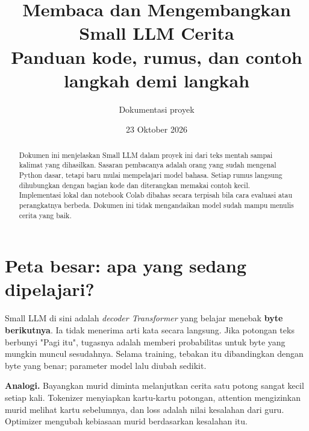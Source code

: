 \documentclass[11pt,a4paper]{article}
\title{Membaca dan Mengembangkan Small LLM Cerita\\
\large Panduan kode, rumus, dan contoh langkah demi langkah}
\author{Dokumentasi proyek \code{train-llm-from-scratch}}
\date{23 Oktober 2026}
\newcommand{\analogi}[1]{\par\smallskip\noindent\textbf{Analogi.} #1\par\smallskip}
\begin{document}
\maketitle
\begin{abstract}
Dokumen ini menjelaskan Small LLM dalam proyek ini dari teks mentah sampai
kalimat yang dihasilkan. Sasaran pembacanya adalah orang yang sudah mengenal
Python dasar, tetapi baru mulai mempelajari model bahasa. Setiap rumus
langsung dihubungkan dengan bagian kode dan diterangkan memakai contoh kecil.
Implementasi lokal dan notebook Colab dibahas secara terpisah bila cara
evaluasi atau perangkatnya berbeda. Dokumen ini tidak mengandaikan model sudah
mampu menulis cerita yang baik.
\end{abstract}
\tableofcontents
\newpage

\section{Peta besar: apa yang sedang dipelajari?}
\label{sec:peta}

Small LLM di sini adalah \emph{decoder Transformer} yang belajar menebak
\textbf{byte berikutnya}. Ia tidak menerima arti kata secara langsung. Jika
potongan teks berbunyi "Pagi itu", tugasnya adalah memberi probabilitas
untuk byte yang mungkin muncul sesudahnya. Selama training, tebakan itu
dibandingkan dengan byte yang benar; parameter model lalu diubah sedikit.

\begin{center}
\end{center}

\analogi{Bayangkan murid diminta melanjutkan cerita satu potong sangat kecil
setiap kali. Tokenizer menyiapkan kartu-kartu potongan, attention mengizinkan
murid melihat kartu sebelumnya, dan loss adalah nilai kesalahan dari guru.
Optimizer mengubah kebiasaan murid berdasarkan kesalahan itu.}
\end{document}
